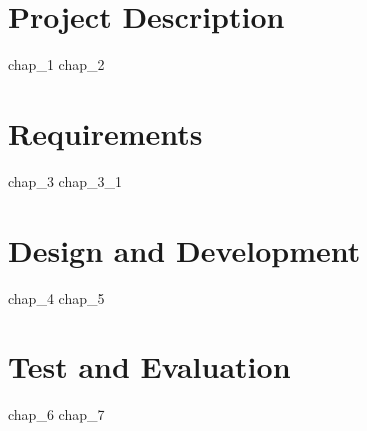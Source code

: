 \documentclass[a4paper, 11pt, oneside]{memoir}
\theoremstyle{plain}
\theoremstyle{plain}
\theoremstyle{plain}
\theoremstyle{definition}
\theoremstyle{plain}
\theoremstyle{plain}
\theoremstyle{plain}
\begin{document}
	\frontmatter
	
	\clearpage
	\tableofcontents*
	\clearpage
	\listoftables
	\listoffigures
	\clearpage

	\mainmatter
	\part{Project Description}
	{chap_1} %
	{chap_2} %
	\part{Requirements}
	{chap_3} %
	{chap_3_1}
	\part{Design and Development}
	{chap_4} %
	{chap_5} %
	\part{Test and Evaluation}
	{chap_6} %
	{chap_7} %

%
	\backmatter
	\printindex
	\renewcommand{\bibname}{References}
	
\end{document}
